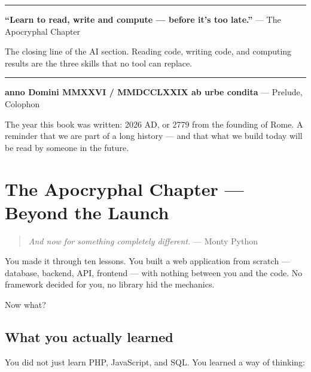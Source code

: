 \documentclass[11pt,a4paper,oneside]{book}
\begin{document}
\begin{center}\rule{0.5\linewidth}{0.5pt}\end{center}

\textbf{``Learn to read, write and compute --- before it's too
late.''} --- The Apocryphal Chapter

The closing line of the AI section. Reading code, writing code,
and computing results are the three skills that no tool can
replace.

\begin{center}\rule{0.5\linewidth}{0.5pt}\end{center}

\textbf{anno Domini MMXXVI / MMDCCLXXIX ab urbe condita} ---
Prelude, Colophon

The year this book was written: 2026 AD, or 2779 from the
founding of Rome. A reminder that we are part of a long history
--- and that what we build today will be read by someone in the
future.

\newpage

\hypertarget{the-apocryphal-chapter-beyond-the-launch}{%
\chapter{The Apocryphal Chapter --- Beyond the
Launch}\label{the-apocryphal-chapter-beyond-the-launch}}

\begin{quote}
\emph{And now for something completely different.} --- Monty
Python
\end{quote}

You made it through ten lessons. You built a web application from
scratch --- database, backend, API, frontend --- with nothing
between you and the code. No framework decided for you, no
library hid the mechanics.

Now what?

\hypertarget{what-you-actually-learned}{%
\section{What you actually
learned}\label{what-you-actually-learned}}

You did not just learn PHP, JavaScript, and SQL. You learned a
way of thinking:
\end{document}
